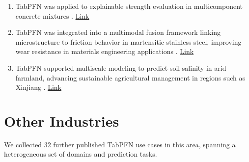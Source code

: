 \begin{enumerate}
\item TabPFN was applied to explainable strength evaluation in multicomponent concrete mixtures \cite{manuf_usecase10_multicomponent_concrete}. \href{https://www.mdpi.com/1996-1944/18/19/4456}{Link}

\item TabPFN was integrated into a multimodal fusion framework linking microstructure to friction behavior in martensitic stainless steel, improving wear resistance in materials engineering applications \cite{manuf_usecase11_martensitic_friction_multimodal}. \href{https://papers.ssrn.com/sol3/papers.cfm?abstract_id=5346149}{Link}

\item TabPFN supported multiscale modeling to predict soil salinity in arid farmland, advancing sustainable agricultural management in regions such as Xinjiang \cite{manuf_usecase12_soil_salinity_multiscale}. \href{https://papers.ssrn.com/sol3/papers.cfm?abstract_id=5591702}{Link}

\end{enumerate}

\section*{Other Industries}

We collected 32 further published TabPFN use cases in this area, spanning a heterogeneous set of domains and prediction tasks.

